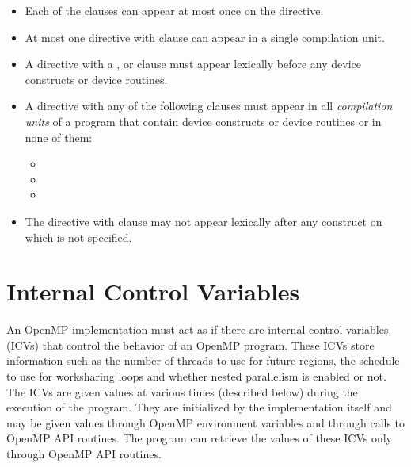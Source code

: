 \begin{itemize}

\item Each of the clauses can appear at most once on the directive.

\item At most one  directive with  
      clause can appear in a single compilation
unit.

\item A  directive with a ,
       or  clause must 
      appear lexically before any device constructs or device routines.

\item A  directive with any of the following clauses must appear 
      in all \emph{compilation units} of a program that contain device
      constructs or device routines or in none of them:

 \begin{itemize}
   \item {}
   \item {}
   \item {}
 \end{itemize}

\item The  directive with 
clause may not appear lexically after any  construct on which
 is not specified.

\end{itemize}


\section{Internal Control Variables}
\label{sec:Internal Control Variables}

An OpenMP implementation must act as if there are internal control variables (ICVs)
that control the behavior of an OpenMP program. These ICVs store information such as
the number of threads to use for future  regions, the schedule to use for
worksharing loops and whether nested parallelism is enabled or not. The ICVs are given
values at various times (described below) during the execution of the program. They are
initialized by the implementation itself and may be given values through OpenMP
environment variables and through calls to OpenMP API routines. The program can
retrieve the values of these ICVs only through OpenMP API routines.


